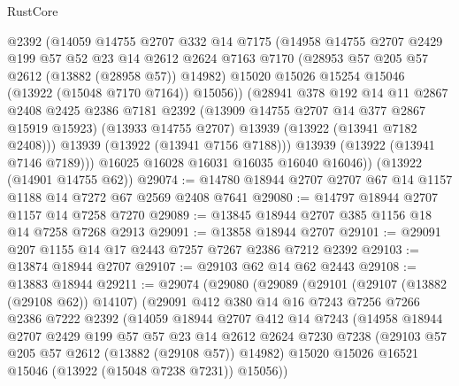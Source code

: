 \begin{lexlean}{RustCore}
\begin{coremodule}
            @2392
            (@14059
              @14755
              @2707
              @332
              @14
              @7175
              (@14958
                @14755
                @2707
                @2429
                @199
                @57
                @52
                @23
                @14
                @2612
                @2624
                @7163
                @7170
                (@28953 @57 @205 @57 @2612 (@13882 (@28958 @57)) @14982)
                @15020
                @15026
                @15254
                @15046
                (@13922 (@15048 @7170 @7164))
                @15056))
            (@28941
              @378
              @192
              @14
              @11
              @2867
              @2408
              @2425
              @2386
              @7181
              @2392
              (@13909 @14755 @2707 @14 @377 @2867 @15919 @15923)
              (@13933 @14755 @2707)
              @13939
              (@13922 (@13941 @7182 @2408)))
            @13939
            (@13922 (@13941 @7156 @7188)))
          @13939
          (@13922 (@13941 @7146 @7189)))
        @16025
        @16028
        @16031
        @16035
        @16040
        @16046))
    (@13922 (@14901 @14755 @62))
@29074 := @14780 @18944 @2707 @2707 @67 @14 @1157 @1188 @14 @7272 @67 @2569 @2408 @7641
@29080 := @14797 @18944 @2707 @1157 @14 @7258 @7270
@29089 := @13845 @18944 @2707 @385 @1156 @18 @14 @7258 @7268 @2913
@29091 := @13858 @18944 @2707
@29101 := @29091 @207 @1155 @14 @17 @2443 @7257 @7267 @2386 @7212 @2392
@29103 := @13874 @18944 @2707
@29107 := @29103 @62 @14 @62 @2443
@29108 := @13883 @18944
@29211 := @29074
    (@29080
      (@29089
        (@29101
          (@29107 (@13882 (@29108 @62)) @14107)
          (@29091
            @412
            @380
            @14
            @16
            @7243
            @7256
            @7266
            @2386
            @7222
            @2392
            (@14059
              @18944
              @2707
              @412
              @14
              @7243
              (@14958
                @18944
                @2707
                @2429
                @199
                @57
                @57
                @23
                @14
                @2612
                @2624
                @7230
                @7238
                (@29103 @57 @205 @57 @2612 (@13882 (@29108 @57)) @14982)
                @15020
                @15026
                @16521
                @15046
                (@13922 (@15048 @7238 @7231))
                @15056))

\end{coremodule}
\end{lexlean}
